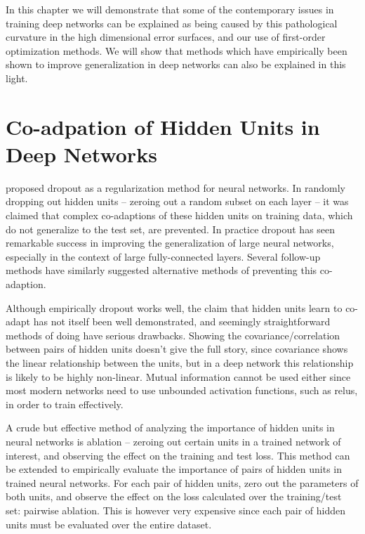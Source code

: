 \documentclass[thesis]{subfiles}
\begin{document}
In this chapter we will demonstrate that some of the contemporary issues in training deep networks can be explained as being caused by this pathological curvature in the high dimensional error surfaces, and our use of first-order optimization methods. We will show that methods which have empirically been shown to improve generalization in deep networks can also be explained in this light.



\section{Co-adpation of Hidden Units in Deep Networks}
\citet{Hinton2012} proposed dropout as a regularization method for neural networks. In randomly dropping out hidden units -- zeroing out a random subset on each layer -- it was claimed that complex co-adaptions of these hidden units on training data, which do not generalize to the test set, are prevented. In practice dropout has seen remarkable success in improving the generalization of large neural networks, especially in the context of large fully-connected layers. Several follow-up methods have similarly suggested alternative methods of preventing this co-adaption.

Although empirically dropout works well, the claim that hidden units learn to co-adapt has not itself been well demonstrated, and seemingly straightforward methods of doing have serious drawbacks. Showing the covariance/correlation between pairs of hidden units doesn't give the full story, since covariance shows the linear relationship between the units, but in a deep network this relationship is likely to be highly non-linear. Mutual information cannot be used either since most modern networks need to use unbounded activation functions, such as \glspl{relu}, in order to train effectively.

A crude but effective method of analyzing the importance of hidden units in neural networks is ablation -- zeroing out certain units in a trained network of interest, and observing the effect on the training and test loss. This method can be extended to empirically evaluate the importance of pairs of hidden units in trained neural networks. For each pair of hidden units, zero out the parameters of both units, and observe the effect on the loss calculated over the training/test set: pairwise ablation. This is however very expensive since each pair of hidden units must be evaluated over the entire dataset.
\end{document}
